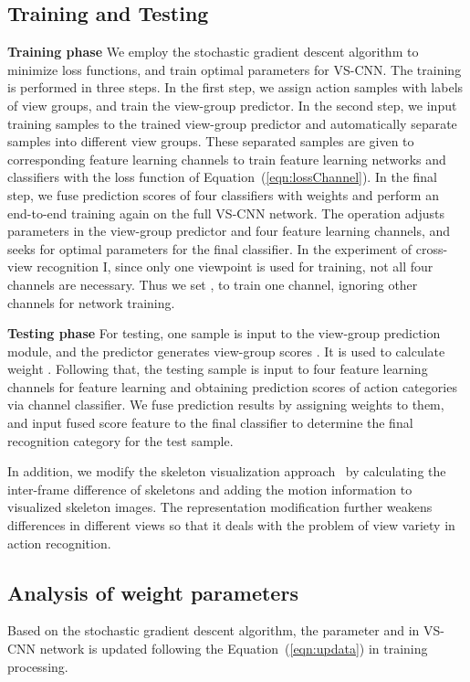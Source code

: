\documentclass[journal]{IEEEtran}
\begin{document}
\subsection{Training and Testing}
\textbf{Training phase}
We employ the stochastic gradient descent algorithm to minimize loss functions, and train optimal parameters for VS-CNN. The training is performed in three steps. In the first step, we assign action samples with labels of view groups, and train the view-group predictor. In the second step, we input training samples to the trained view-group predictor and automatically separate samples into different view groups. These separated samples are given to corresponding feature learning channels to train feature learning networks and classifiers with the loss function of Equation~(\ref{eqn:lossChannel}). In the final step, we fuse prediction scores of four classifiers with weights  and perform an end-to-end training again on the full VS-CNN network. The operation adjusts parameters in the view-group predictor and four feature learning channels, and seeks for optimal parameters for the final classifier.
In the experiment of cross-view recognition I, since only one viewpoint is used for training, not all four channels are necessary. Thus we set , to train one channel, ignoring other channels for network training.

\textbf{Testing phase}
For testing, one sample is input to the view-group prediction module, and the predictor generates view-group scores . It is used to calculate weight . Following that, the testing sample is input to four feature learning channels for feature learning and obtaining prediction scores of action categories via channel classifier. We fuse prediction results by assigning weights  to them, and input fused score feature to the final classifier to determine the final recognition category for the test sample.


In addition, we modify the skeleton visualization approach~\cite{EnhancedSK2017} by calculating the inter-frame difference of skeletons and adding the motion information to visualized skeleton images. The representation modification further weakens differences in different views so that it deals with the problem of view variety in action recognition.

\subsection{Analysis of weight parameters }
Based on the stochastic gradient descent algorithm, the parameter  and  in VS-CNN network is updated following the Equation~(\ref{eqn:updata}) in training processing.
\end{document}

